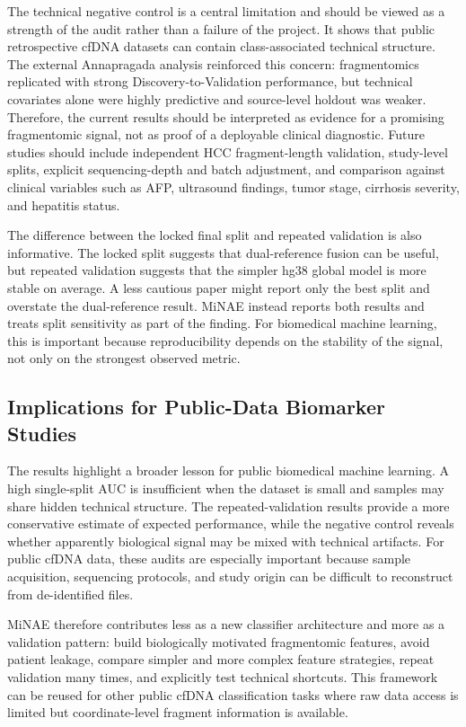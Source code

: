 \documentclass[conference]{IEEEtran}
\begin{document}
The technical negative control is a central limitation and should be viewed as a strength of the audit rather than a failure of the project. It shows that public retrospective cfDNA datasets can contain class-associated technical structure. The external Annapragada analysis reinforced this concern: fragmentomics replicated with strong Discovery-to-Validation performance, but technical covariates alone were highly predictive and source-level holdout was weaker. Therefore, the current results should be interpreted as evidence for a promising fragmentomic signal, not as proof of a deployable clinical diagnostic. Future studies should include independent HCC fragment-length validation, study-level splits, explicit sequencing-depth and batch adjustment, and comparison against clinical variables such as AFP, ultrasound findings, tumor stage, cirrhosis severity, and hepatitis status.

The difference between the locked final split and repeated validation is also informative. The locked split suggests that dual-reference fusion can be useful, but repeated validation suggests that the simpler hg38 global model is more stable on average. A less cautious paper might report only the best split and overstate the dual-reference result. MiNAE instead reports both results and treats split sensitivity as part of the finding. For biomedical machine learning, this is important because reproducibility depends on the stability of the signal, not only on the strongest observed metric.

\subsection{Implications for Public-Data Biomarker Studies}
The results highlight a broader lesson for public biomedical machine learning. A high single-split AUC is insufficient when the dataset is small and samples may share hidden technical structure. The repeated-validation results provide a more conservative estimate of expected performance, while the negative control reveals whether apparently biological signal may be mixed with technical artifacts. For public cfDNA data, these audits are especially important because sample acquisition, sequencing protocols, and study origin can be difficult to reconstruct from de-identified files.

MiNAE therefore contributes less as a new classifier architecture and more as a validation pattern: build biologically motivated fragmentomic features, avoid patient leakage, compare simpler and more complex feature strategies, repeat validation many times, and explicitly test technical shortcuts. This framework can be reused for other public cfDNA classification tasks where raw data access is limited but coordinate-level fragment information is available.
\end{document}
